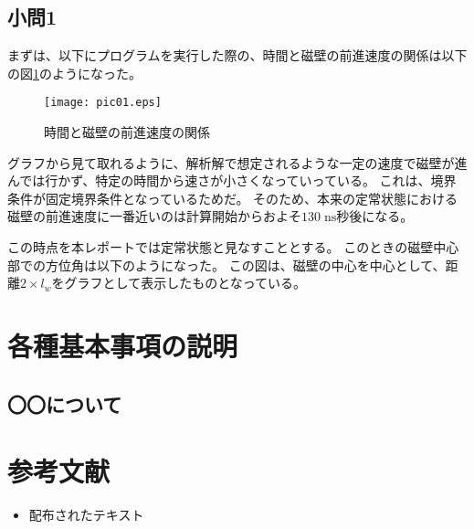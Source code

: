 \documentclass{jsarticle}
\begin{document}
\subsection{小問1}
まずは、以下にプログラムを実行した際の、時間と磁壁の前進速度の関係は以下の図\ref{fig01}のようになった。
\begin{figure}[H]
	\centering
	\texttt{[image: pic01.eps]}
	\caption{時間と磁壁の前進速度の関係}
	\label{fig01}
\end{figure}

グラフから見て取れるように、解析解で想定されるような一定の速度で磁壁が進んでは行かず、特定の時間から速さが小さくなっていっている。
これは、境界条件が固定境界条件となっているためだ。
そのため、本来の定常状態における磁壁の前進速度に一番近いのは計算開始からおよそ$130\;\mathrm{ns}$秒後になる。

この時点を本レポートでは定常状態と見なすこととする。
このときの磁壁中心部での方位角は以下のようになった。
この図は、磁壁の中心を中心として、距離$2\times l_w$をグラフとして表示したものとなっている。


\subsection{}

\section{各種基本事項の説明}
\subsection{〇〇について}

\section{参考文献}

\begin{itemize}
  \item 配布されたテキスト
\end{itemize}
\end{document}
